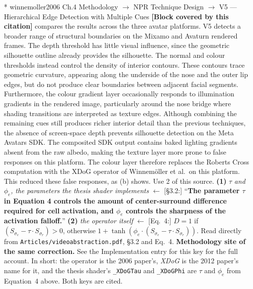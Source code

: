 \documentclass[11pt, a4paper]{article}
\makeatletter
\newcounter{citentry}
\newcommand{\citentry@core}[7]{%
  \stepcounter{citentry}
  \begingroup
  \sbox{\citentry@measurebox}{%
    \begin{minipage}{\linewidth}
      \noindent\colorbox{konstanzblue}{\parbox{\dimexpr\linewidth-2\fboxsep}{%
        \vspace{3pt}
        \textbf{\#\thecitentry \quad #2} \hfill \textit{#3}
        \vspace{3pt}
      }}
      \vspace{3pt}
      \noindent\begin{tabular}{@{}p{2.7cm} p{\dimexpr\linewidth-3cm}@{}}
        \textit{\small Sentence in thesis:} & #4 \\[5pt]
        \textbf{Usage:}\hfill       & #5 \\[5pt]
        \textit{\small Original source:}     & #6 \\[5pt]
        \textbf{How to check:}             & #7 \\
      \end{tabular}
      \vspace{5pt}
      \rule{10pt}{10pt}\quad \textbf{Validated} --- I have read the original and agree it supports the sentence.
    \end{minipage}%
  }%
  \Needspace{\dimexpr\ht\citentry@measurebox+\dp\citentry@measurebox\relax}%
  \endgroup
  \vspace{10pt}
  \noindent\colorbox{konstanzblue}{\parbox{\dimexpr\linewidth-2\fboxsep}{%
    \vspace{3pt}
    \textcolor{white}{\textbf{\#\thecitentry \quad #2}} \hfill \textcolor{white}{\textit{#3}}
    \vspace{3pt}
  }}
  \vspace{3pt}
  \noindent\begin{tabular}{@{}p{2.7cm} p{\dimexpr\linewidth-3cm}@{}}
    \textit{\small Sentence in thesis:} & \textcolor{darkgreen}{#4} \\[5pt]
    \textbf{Usage:}\hfill       & #5 \\[5pt]
    \textit{\small Original source:}     & \textcolor{darkred}{#6} \\[5pt]
    \textbf{How to check:}             & #7 \\
  \end{tabular}
  \vspace{5pt}
  \noindent\CheckBox[name=verified\thecitentry, width=10pt, height=10pt, bordercolor={0 0 0}, borderwidth=0.75, backgroundcolor={1 1 1}#1]{}\quad \textbf{Validated} --- I have read the original and agree it supports the sentence.
  \vspace{3pt}
  \noindent\textcolor{midgray}{\rule{\linewidth}{0.4pt}}
}
\newcommand{\citentry}{\@ifstar{\citentry@core{, checked}}{\citentry@core{}}}
\makeatother
\begin{document}
\begin{Form}
\citentry*
  {winnemoller2006}
  {Ch.4 Methodology $\rightarrow$ NPR Technique Design $\rightarrow$ V5 — Hierarchical Edge Detection with Multiple Cues}
  {\textbf{[Block covered by this citation]} compares the results across the three avatar platforms. V5 detects a broader range of structural boundaries on the Mixamo and Avaturn rendered frames. The depth threshold has little visual influence, since the geometric silhouette outline already provides the silhouette. The normal and colour thresholds instead control the density of interior contours. These contours trace geometric curvature, appearing along the underside of the nose and the outer lip edges, but do not produce clear boundaries between adjacent facial segments. Furthermore, the colour gradient layer occasionally responds to illumination gradients in the rendered image, particularly around the nose bridge where shading transitions are interpreted as texture edges. Although combining the remaining cues still produces richer interior detail than the previous techniques, the absence of screen-space depth prevents silhouette detection on the Meta Avatars SDK. The composited SDK output contains baked lighting gradients absent from the raw albedo, making the texture layer more prone to false responses on this platform. The colour layer therefore replaces the Roberts Cross computation with the XDoG operator of Winnem\"{o}ller et al.\ on this platform. This reduced these false responses, as (b) shows.}
  {Use 2 of this source.}
  {\textbf{(1)} \emph{$\tau$ and $\phi_e$, the parameters the thesis shader implements} $\leftarrow$ [\S3.2:] ``\textbf{The parameter $\tau$ in Equation 4 controls the amount of center-surround difference required for cell activation, and $\phi_e$ controls the sharpness of the activation falloff.}'' \quad \textbf{(2)} \emph{the operator itself} $\leftarrow$ [Eq.~4:] $D = 1$ if $(S_{\sigma_e} - \tau \cdot S_{\sigma_r}) > 0$, otherwise \textbf{$1 + \tanh(\phi_e \cdot (S_{\sigma_e} - \tau \cdot S_{\sigma_r}))$}.}
  {Read directly from \texttt{\footnotesize Articles/videoabstraction.pdf}, \S3.2 and Eq.~4. \textbf{Methodology site of the same correction.} See the Implementation entry for this key for the full account. In short: the operator is the 2006 paper's, \emph{XDoG} is the 2012 paper's name for it, and the thesis shader's \texttt{\_XDoGTau} and \texttt{\_XDoGPhi} are $\tau$ and $\phi_e$ from Equation~4 above. Both keys are cited.}


\end{Form}
\end{document}
